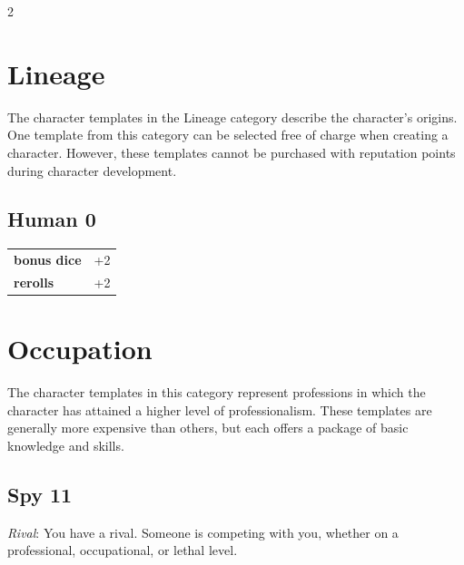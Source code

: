 \label{ch:appendix-templates}

\begin{multicols}{2}

\section{Lineage}

The character templates in the Lineage category describe the character's origins. One template from this category can be selected free of charge when creating a character. However, these templates cannot be purchased with reputation points during character development.

\begin{tcolorbox}
    \subsection*{Human \hfill \small{0 }}
    \tcblower




\begin{tabular}{@{}ll@{}}
    \textbf{bonus dice} & +2\\
    \textbf{rerolls} & +2\\
\end{tabular}


\end{tcolorbox}

\section{Occupation}

The character templates in this category represent professions in which the character has attained a higher level of professionalism. These templates are generally more expensive than others, but each offers a package of basic knowledge and skills.

\begin{tcolorbox}
    \subsection*{Spy \hfill \small{11 }}
    \tcblower
\textit{Rival}: You have a rival. Someone is competing with you, whether on a professional, occupational, or lethal level.



\end{tcolorbox}
\end{multicols}
